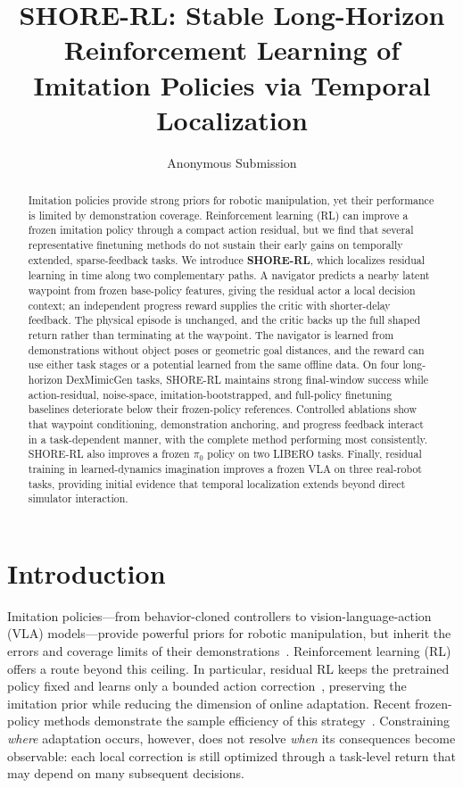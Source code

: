 \documentclass[letterpaper]{article} %
\title{SHORE-RL: Stable Long-Horizon Reinforcement Learning of Imitation
Policies via Temporal Localization}
\author{Anonymous Submission}
\begin{document}
\maketitle

\begin{abstract}
Imitation policies provide strong priors for robotic manipulation, yet their
performance is limited by demonstration coverage. Reinforcement learning (RL)
can improve a frozen imitation policy through a compact action residual, but
we find that several representative finetuning methods do not sustain their
early gains on temporally extended, sparse-feedback tasks. We introduce
\textbf{SHORE-RL}, which localizes residual learning in time along two
complementary paths. A navigator predicts a nearby latent waypoint from frozen
base-policy features, giving the residual actor a local decision context; an
independent progress reward supplies the critic with shorter-delay feedback.
The physical episode is unchanged, and the critic backs up the full shaped
return rather than terminating at the waypoint. The navigator is learned from
demonstrations without object poses or geometric goal distances, and the
reward can use either task stages or a
potential learned from the same offline data. On four long-horizon
DexMimicGen tasks, SHORE-RL maintains strong final-window success while
action-residual, noise-space, imitation-bootstrapped, and full-policy
finetuning baselines deteriorate below their frozen-policy references.
Controlled ablations show that waypoint conditioning, demonstration
anchoring, and progress feedback interact in a task-dependent manner, with
the complete method performing most consistently. SHORE-RL also improves a
frozen $\pi_0$ policy on two LIBERO tasks. Finally, residual training in
learned-dynamics imagination improves a frozen VLA on three real-robot tasks,
providing initial evidence that temporal localization extends beyond direct
simulator interaction.
\end{abstract}

\section{Introduction}
Imitation policies---from behavior-cloned controllers to
vision-language-action (VLA) models---provide powerful priors for robotic
manipulation, but inherit the errors and coverage limits of their
demonstrations~\cite{ross2011dagger,mandlekar2021matters}. Reinforcement
learning (RL) offers a route beyond this ceiling. In particular, residual RL
keeps the pretrained policy fixed and learns only a bounded action
correction~\cite{johannink2019residual}, preserving the imitation prior while
reducing the dimension of online adaptation. Recent frozen-policy methods
demonstrate the sample efficiency of this strategy~\cite{resfit2025residual}.
Constraining \emph{where} adaptation occurs, however, does not resolve
\emph{when} its consequences become observable: each local correction is
still optimized through a task-level return that may depend on many subsequent
decisions.
\end{document}
